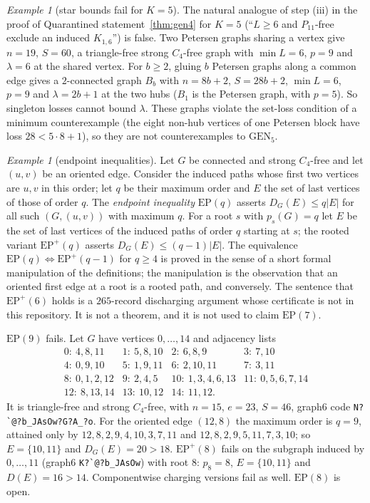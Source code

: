 \documentclass[11pt]{amsart}
\theoremstyle{definition}
\theoremstyle{remark}
\newtheorem{example}[theorem]{Example}
\newcommand{\pp}{p}
\newcommand{\GEN}{\mathrm{GEN}}
\begin{document}
\begin{example}[star bounds fail for $K=5$]\label{ex:star5}
The natural analogue of step (iii) in the proof of Quarantined statement~\ref{thm:gen4} for $K=5$ (``$L\ge6$ and $P_{11}$-free exclude an induced $K_{1,6}$'') is false. Two Petersen graphs sharing a vertex give $n=19$, $S=60$, a triangle-free strong $C_4$-free graph with $\min L=6$, $\pp=9$ and $\lambda=6$ at the shared vertex. For $b\ge2$, gluing $b$ Petersen graphs along a common edge gives a $2$-connected graph $B_b$ with $n=8b+2$, $S=28b+2$, $\min L=6$, $\pp=9$ and $\lambda=2b+1$ at the two hubs ($B_1$ is the Petersen graph, with $\pp=5$). So singleton losses cannot bound $\lambda$. These graphs violate the set-loss condition of a minimum counterexample (the eight non-hub vertices of one Petersen block have loss $28<5\cdot8+1$), so they are not counterexamples to $\GEN_5$.
\end{example}

\begin{example}[endpoint inequalities]\label{ex:ep}
Let $G$ be connected and strong $C_4$-free and let $(u,v)$ be an oriented edge. Consider the induced paths whose first two vertices are $u,v$ in this order; let $q$ be their maximum order and $E$ the set of last vertices of those of order $q$. The \emph{endpoint inequality} $\mathrm{EP}(q)$ asserts $D_G(E)\le q|E|$ for all such $(G,(u,v))$ with maximum $q$. For a root $s$ with $\pp_s(G)=q$ let $E$ be the set of last vertices of the induced paths of order $q$ starting at $s$; the rooted variant $\mathrm{EP}^+(q)$ asserts $D_G(E)\le(q-1)|E|$. The equivalence $\mathrm{EP}(q)\Leftrightarrow\mathrm{EP}^+(q-1)$ for $q\ge4$ is proved in the sense of a short formal manipulation of the definitions; the manipulation is the observation that an oriented first edge at a root is a rooted path, and conversely. The sentence that $\mathrm{EP}^+(6)$ holds is a $265$-record discharging argument whose certificate is not in this repository. It is not a theorem, and it is not used to claim $\mathrm{EP}(7)$.

$\mathrm{EP}(9)$ fails. Let $G$ have vertices $0,\dots,14$ and adjacency lists
\[
\begin{array}{llll}
0{:}\ 4,8,11 & 1{:}\ 5,8,10 & 2{:}\ 6,8,9 & 3{:}\ 7,10\\
4{:}\ 0,9,10 & 5{:}\ 1,9,11 & 6{:}\ 2,10,11 & 7{:}\ 3,11\\
8{:}\ 0,1,2,12 & 9{:}\ 2,4,5 & 10{:}\ 1,3,4,6,13 & 11{:}\ 0,5,6,7,14\\
12{:}\ 8,13,14 & 13{:}\ 10,12 & 14{:}\ 11,12. &
\end{array}
\]
It is triangle-free and strong $C_4$-free, with $n=15$, $e=23$, $S=46$, graph6 code \verb|N?`@?b_JAsOw?G?A_?o|. For the oriented edge $(12,8)$ the maximum order is $q=9$, attained only by $12,8,2,9,4,10,3,7,11$ and $12,8,2,9,5,11,7,3,10$; so $E=\{10,11\}$ and $D_G(E)=20>18$. $\mathrm{EP}^+(8)$ fails on the subgraph induced by $0,\dots,11$ (graph6 \verb|K?`@?b_JAsOw|) with root $8$: $\pp_8=8$, $E=\{10,11\}$ and $D(E)=16>14$. Componentwise charging versions fail as well. $\mathrm{EP}(8)$ is open.
\end{example}
\end{document}
